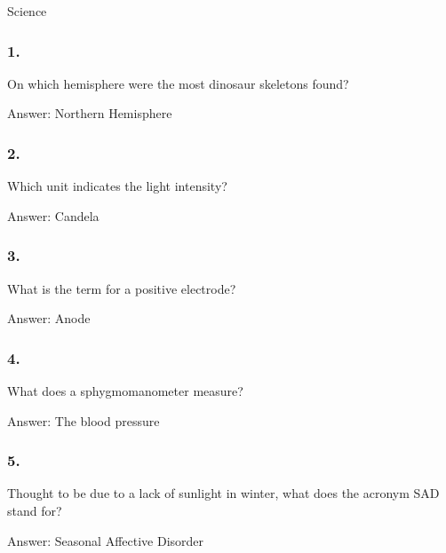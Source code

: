 \documentclass{beamer}
\begin{document}
    \begin{frame}
        \begin{center}
            \Huge Science
        \end{center}
    \end{frame}


    \begin{frame}
        \frametitle{1.}
        On which hemisphere were the most dinosaur skeletons found?\\

        \begin{center}
            Answer: Northern Hemisphere
        \end{center}
    \end{frame}

    \begin{frame}
        \frametitle{2.}
        Which unit indicates the light intensity?\\

        \begin{center}
            Answer: Candela
        \end{center}
    \end{frame}

    \begin{frame}
        \frametitle{3.}
        What is the term for a positive electrode?\\

        \begin{center}
            Answer: Anode
        \end{center}
    \end{frame}

    \begin{frame}
        \frametitle{4.}
        What does a sphygmomanometer measure?\\

        \begin{center}
            Answer: The blood pressure
        \end{center}
    \end{frame}

    \begin{frame}
        \frametitle{5.}
        Thought to be due to a lack of sunlight in winter, what does the
        acronym SAD stand for?\\

        \begin{center}
            Answer: Seasonal Affective Disorder
        \end{center}
    \end{frame}
\end{document}
